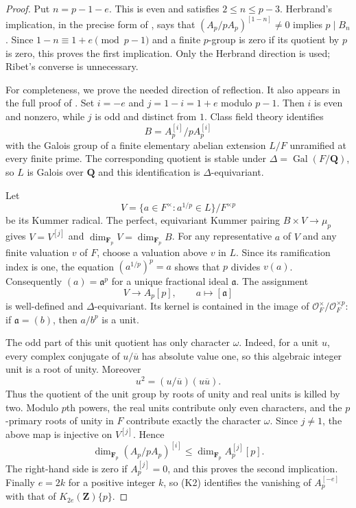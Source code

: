 \documentclass[11pt,a4paper]{article}
\theoremstyle{definition}
\begin{document}
\begin{proof}
Put $n=p-1-e$. This is even and satisfies $2\le n\le p-3$.
Herbrand's implication, in the precise form of
\cite[Main Theorem (1.1), p.~151]{Ribet1976}, says that
$(A_p/pA_p)^{[1-n]}\ne0$ implies $p\mid B_n$.
Since $1-n\equiv1+e\pmod{p-1}$ and a finite $p$-group is zero
if its quotient by $p$ is zero, this proves the first implication.
Only the Herbrand direction is used; Ribet's converse is unnecessary.

For completeness, we prove the needed direction of reflection.
It also appears in the full proof of
\cite[Theorem~4.4.2, pp.~111--113, and Corollary~4.4.4,
p.~113]{K17SharifiReflection}.
Set $i=-e$ and $j=1-i=1+e$ modulo $p-1$.
Then $i$ is even and nonzero, while $j$ is odd and distinct from $1$.
Class field theory identifies
\[
 B=A_p^{[i]}/pA_p^{[i]}
\]
with the Galois group of a finite elementary abelian extension $L/F$
unramified at every finite prime. The corresponding quotient is stable
under $\Delta=\operatorname{Gal}(F/\mathbf Q)$, so $L$ is Galois
over $\mathbf Q$ and this identification is $\Delta$-equivariant.

Let
\[
 V=\{a\in F^\times:a^{1/p}\in L\}/F^{\times p}
\]
be its Kummer radical. The perfect, equivariant Kummer pairing
$B\times V\to\mu_p$ gives
$V=V^{[j]}$ and $\dim_{\mathbf F_p}V=\dim_{\mathbf F_p}B$.
For any representative $a$ of $V$ and any finite valuation $v$ of $F$,
choose a valuation above $v$ in $L$. Since its ramification index is one,
the equation $(a^{1/p})^p=a$ shows that $p$ divides $v(a)$.
Consequently $(a)=\mathfrak a^p$ for a unique fractional ideal
$\mathfrak a$. The assignment
\[
             V\longrightarrow A_p[p],\qquad
             a\longmapsto[\mathfrak a]
\]
is well-defined and $\Delta$-equivariant. Its kernel is contained in
the image of $\mathcal O_F^\times/\mathcal O_F^{\times p}$:
if $\mathfrak a=(b)$, then $a/b^p$ is a unit.

The odd part of this unit quotient has only character $\omega$.
Indeed, for a unit $u$, every complex conjugate of $u/\overline u$
has absolute value one, so this algebraic integer unit is a root of
unity. Moreover
\[
 u^2=(u/\overline u)(u\overline u).
\]
Thus the quotient of the unit group by roots of unity and real units
is killed by two. Modulo $p$th powers, the real units contribute only
even characters, and the $p$-primary roots of unity in $F$ contribute
exactly the character $\omega$. Since $j\ne1$, the above map is
injective on $V^{[j]}$. Hence
\[
 \dim_{\mathbf F_p}(A_p/pA_p)^{[i]}
 \le \dim_{\mathbf F_p}A_p^{[j]}[p].
\]
The right-hand side is zero if $A_p^{[j]}=0$, and this proves the
second implication. Finally $e=2k$ for a positive integer $k$, so (K2)
identifies the vanishing of $A_p^{[-e]}$ with that of
$K_{2e}(\mathbf Z)\{p\}$.
\end{proof}
\end{document}
